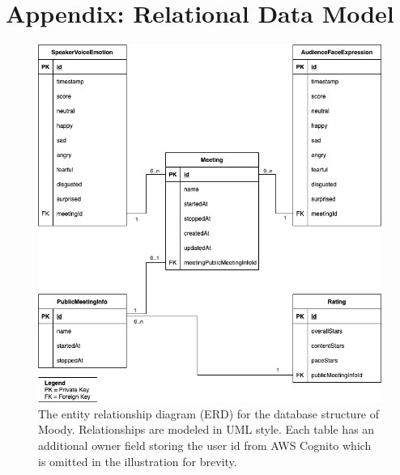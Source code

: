\newpage
\section*{Appendix: Relational Data Model}
\label{sec:appendix_relational_data_model}
\begin{figure}[ht]
\label{fig:erd}
\centering
\includegraphics[width=1\textwidth]{assets/erd.png}
\caption{The entity relationship diagram (ERD) for the database structure of Moody. Relationships are modeled in UML style. Each table has an additional owner field  storing the user id from AWS Cognito which is omitted in the illustration for brevity.}
\end{figure}
